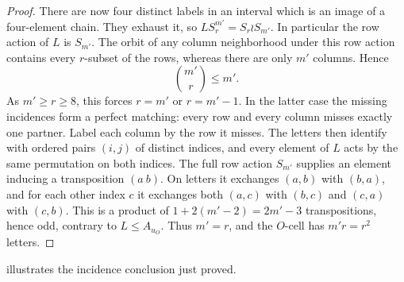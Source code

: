 \begin{proof}
There are now four distinct labels in an interval which is an image of a
four-element chain.  They exhaust it, so
\(LS_r^{m'}=S_r\wr S_{m'}\).  In particular the row action of \(L\) is
\(S_{m'}\).  The orbit of any column neighborhood under this row action
contains every \(r\)-subset of the rows, whereas there are only \(m'\)
columns.  Hence
\[
 \binom{m'}r\le m'.
\]
As \(m'\ge r\ge8\), this forces \(r=m'\) or \(r=m'-1\).
In the latter case the missing incidences form a perfect matching:
every row and every column misses exactly one partner.  Label each
column by the row it misses.  The letters then identify with ordered
pairs \((i,j)\) of distinct indices, and every element of \(L\)
acts by the same permutation on both indices.  The full row action
\(S_{m'}\) supplies an element inducing a transposition \((a\ b)\).
On letters it exchanges \((a,b)\) with \((b,a)\), and for each
other index \(c\) it exchanges both \((a,c)\) with \((b,c)\) and
\((c,a)\) with \((c,b)\).  This is a product of
\(1+2(m'-2)=2m'-3\) transpositions, hence odd, contrary to
\(L\le A_{u_O}\).  Thus \(m'=r\), and the \(O\)-cell has
\(m'r=r^2\) letters.
\end{proof}

 illustrates the incidence conclusion just proved.

